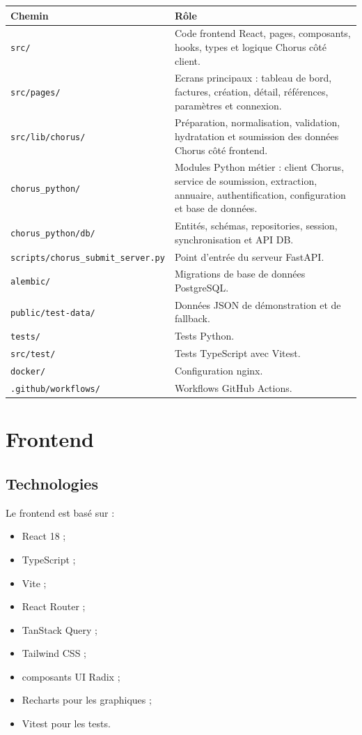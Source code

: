 \documentclass[11pt,a4paper]{article}
\begin{document}
\begin{longtable}{|p{}|p{}|}
  \hline
  \textbf{Chemin} & \textbf{Rôle} \\
  \hline
  \texttt{src/} &
  Code frontend React, pages, composants, hooks, types et logique Chorus côté
  client. \\
  \hline
  \texttt{src/pages/} &
  Ecrans principaux : tableau de bord, factures, création, détail, références,
  paramètres et connexion. \\
  \hline
  \texttt{src/lib/chorus/} &
  Préparation, normalisation, validation, hydratation et soumission des données
  Chorus côté frontend. \\
  \hline
  \texttt{chorus\_python/} &
  Modules Python métier : client Chorus, service de soumission, extraction,
  annuaire, authentification, configuration et base de données. \\
  \hline
  \texttt{chorus\_python/db/} &
  Entités, schémas, repositories, session, synchronisation et API DB. \\
  \hline
  \texttt{scripts/chorus\_submit\_server.py} &
  Point d'entrée du serveur FastAPI. \\
  \hline
  \texttt{alembic/} &
  Migrations de base de données PostgreSQL. \\
  \hline
  \texttt{public/test-data/} &
  Données JSON de démonstration et de fallback. \\
  \hline
  \texttt{tests/} &
  Tests Python. \\
  \hline
  \texttt{src/test/} &
  Tests TypeScript avec Vitest. \\
  \hline
  \texttt{docker/} &
  Configuration nginx. \\
  \hline
  \texttt{.github/workflows/} &
  Workflows GitHub Actions. \\
  \hline
\end{longtable}

\section{Frontend}

\subsection{Technologies}

Le frontend est basé sur :

\begin{itemize}
  \item React 18 ;
  \item TypeScript ;
  \item Vite ;
  \item React Router ;
  \item TanStack Query ;
  \item Tailwind CSS ;
  \item composants UI Radix ;
  \item Recharts pour les graphiques ;
  \item Vitest pour les tests.
\end{itemize}
\end{document}
